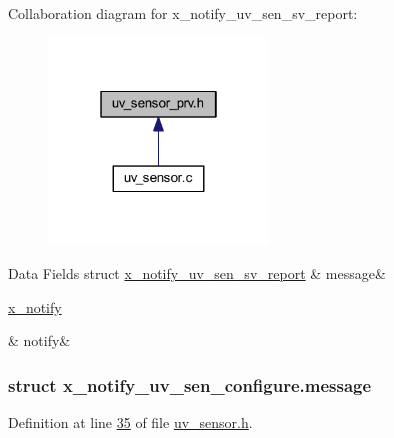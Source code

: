 Collaboration diagram for x\+\_\+notify\+\_\+uv\+\_\+sen\+\_\+sv\+\_\+report\+:\nopagebreak
\begin{figure}[H]
\begin{center}
\leavevmode
\includegraphics[width=166pt]{d2/d0c/a01713}
\end{center}
\end{figure}
\begin{DoxyFields}{Data Fields}
\hypertarget{a00020_ad33830a7f62f9d3eda53dc0bce9c1868}{struct \hyperlink{a00020_d3/db2/a00869}{x\+\_\+notify\+\_\+uv\+\_\+sen\+\_\+sv\+\_\+report}}\label{a00020_ad33830a7f62f9d3eda53dc0bce9c1868}
&
message&
\\
\hline

\hypertarget{a00020_a8e6a04c2283f9fd7b8dcbc62faba5847}{\hyperlink{a00036_df/d4c/a00851}{x\+\_\+notify}}\label{a00020_a8e6a04c2283f9fd7b8dcbc62faba5847}
&
notify&
\\
\hline

\end{DoxyFields}
\label{d2/db8/a00867}
\hypertarget{a00020_d2/db8/a00867}{}
\subsubsection{struct x\+\_\+notify\+\_\+uv\+\_\+sen\+\_\+configure.\+message}


Definition at line \hyperlink{a00020_source_l00035}{35} of file \hyperlink{a00020_source}{uv\+\_\+sensor.\+h}.



